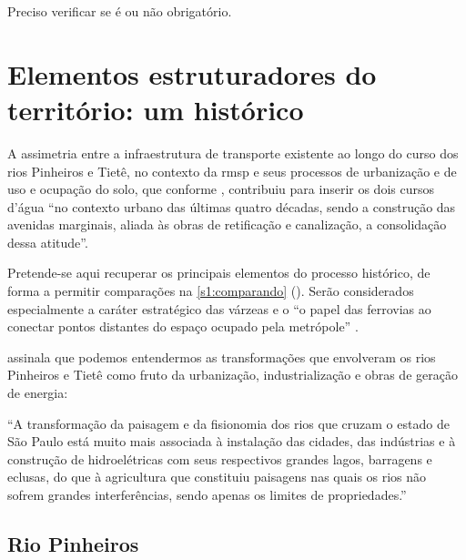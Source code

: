 \documentclass[
article,			%
11pt,				%
oneside,			%
a4paper,			%
english,			%
brazil,				%
sumario=tradicional
]{abntex2}
\begin{document}
	Preciso verificar se é ou não obrigatório.
	
	\lipsum[3]
	
	\section{Elementos estruturadores do território: um histórico} \label{s1:elementos}
	
	
	A assimetria entre a infraestrutura de transporte existente ao longo do curso dos rios Pinheiros e Tietê, no contexto da \glsdesc{rmsp} e seus processos de urbanização e de uso e ocupação do solo, que conforme , contribuiu para inserir os dois cursos d'água ``no contexto urbano das últimas quatro décadas, sendo a construção das avenidas marginais, aliada às obras de retificação e canalização, a consolidação dessa atitude''.
	
	Pretende-se aqui recuperar os principais elementos do processo histórico, de forma a permitir comparações na \autoref{s1:comparando} (). Serão considerados especialmente a caráter estratégico das várzeas \cite[p.63]{franco2005a} e o ``o papel das ferrovias ao conectar pontos distantes do espaço ocupado pela metrópole'' \cite[p.63]{franco2005a}.
	
	 assinala que podemos entendermos as transformações que envolveram os rios Pinheiros e Tietê como fruto da urbanização, industrialização e obras de geração de energia:
	
	\begin{citacao}
		``A transformação da paisagem e da fisionomia dos rios que cruzam o estado de São Paulo está muito mais associada à instalação das cidades, das indústrias e à construção de hidroelétricas com seus respectivos grandes lagos, barragens e eclusas, do que à agricultura que constituiu paisagens nas quais os rios não sofrem grandes interferências, sendo apenas os limites de propriedades.''
	\end{citacao}
	
	\subsection{Rio Pinheiros} \label{s2:riopinheiros}
	
\end{document}
